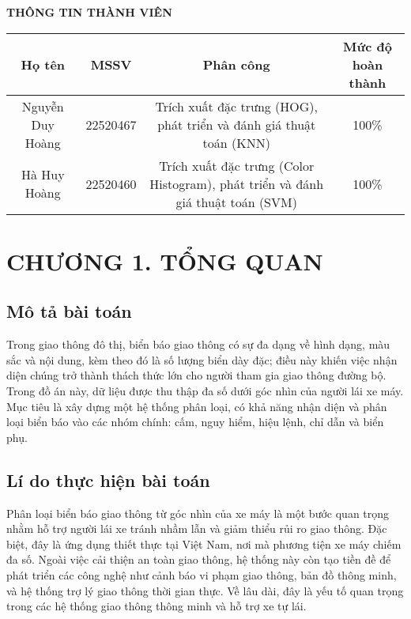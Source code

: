 \documentclass[a4paper,12pt]{article}
\begin{document}
\newpage
\thispagestyle{empty}
\begin{center}
    \textbf{\large THÔNG TIN THÀNH VIÊN}  %
\end{center}

\begin{center}
\begin{tabular}{|c|c|c|c|}
\hline
\textbf{Họ tên} & \textbf{MSSV} & \textbf{Phân công} & \textbf{Mức độ hoàn thành} \\
\hline
Nguyễn Duy Hoàng & 22520467 & \parbox{5cm}{\centering Trích xuất đặc trưng (HOG), phát triển và đánh giá thuật toán (KNN)} & 100\% \\
\hline
Hà Huy Hoàng & 22520460 & \parbox{5cm}{\centering Trích xuất đặc trưng (Color Histogram), phát triển và đánh giá thuật toán (SVM)} & 100\% \\
\hline
\end{tabular}
\end{center}

\newpage
\setcounter{page}{1}
\pagestyle{plain}
\section*{\centering CHƯƠNG 1. TỔNG QUAN}
\vspace{1cm}
\setcounter{section}{1}
\subsection{Mô tả bài toán}
\hspace{5mm}Trong giao thông đô thị, biển báo giao thông có sự đa dạng về hình dạng, màu sắc và nội dung, kèm theo đó là số lượng biển dày đặc; điều này khiến việc nhận diện chúng trở thành thách thức lớn cho người tham gia giao thông đường bộ. Trong đồ án này, dữ liệu được thu thập đa số dưới góc nhìn của người lái xe máy. Mục tiêu là xây dựng một hệ thống phân loại, có khả năng nhận diện và phân loại biển báo vào các nhóm chính: cấm, nguy hiểm, hiệu lệnh, chỉ dẫn và biển phụ.  

\subsection{Lí do thực hiện bài toán}
\hspace{5mm}Phân loại biển báo giao thông từ góc nhìn của xe máy là một bước quan trọng nhằm hỗ trợ người lái xe tránh nhầm lẫn và giảm thiểu rủi ro giao thông. Đặc biệt, đây là ứng dụng thiết thực tại Việt Nam, nơi mà phương tiện xe máy chiếm đa số. Ngoài việc cải thiện an toàn giao thông, hệ thống này còn tạo tiền đề để phát triển các công nghệ như cảnh báo vi phạm giao thông, bản đồ thông minh, và hệ thống trợ lý giao thông thời gian thực. Về lâu dài, đây là yếu tố quan trọng trong các hệ thống giao thông thông minh và hỗ trợ xe tự lái.
\end{document}
